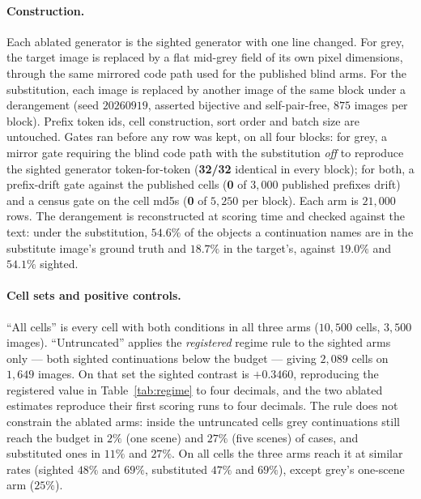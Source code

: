 \paragraph{Construction.} Each ablated generator is the sighted generator with one line changed. For
grey, the target image is replaced by a flat mid-grey field of its own pixel dimensions, through the
same mirrored code path used for the published blind arms. For the substitution, each image is
replaced by another image of the same block under a derangement (seed $20260919$, asserted bijective
and self-pair-free, $875$ images per block). Prefix token ids, cell construction, sort order and
batch size are untouched. Gates ran before any row was kept, on all four blocks: for grey, a mirror
gate requiring the blind code path with the substitution \emph{off} to reproduce the sighted
generator token-for-token (\textbf{32/32} identical in every block); for both, a prefix-drift gate
against the published cells (\textbf{0} of $3{,}000$ published prefixes drift) and a census gate on
the cell md5s (\textbf{0} of $5{,}250$ per block). Each arm is $21{,}000$ rows. The derangement is
reconstructed at scoring time and checked against the text: under the substitution, $54.6\%$ of the
objects a continuation names are in the substitute image's ground truth and $18.7\%$ in the
target's, against $19.0\%$ and $54.1\%$ sighted.

\paragraph{Cell sets and positive controls.} ``All cells'' is every cell with both conditions in all
three arms ($10{,}500$ cells, $3{,}500$ images). ``Untruncated'' applies the \emph{registered} regime rule
to the sighted arms only --- both sighted continuations below the budget --- giving $2{,}089$ cells on
$1{,}649$ images. On that set the sighted contrast is $+0.3460$, reproducing the registered value in
Table~\ref{tab:regime} to four decimals, and the two ablated estimates reproduce their first scoring
runs to four decimals. The rule does not constrain the ablated arms: inside the untruncated cells grey
continuations still reach the budget in $2\%$ (one scene) and $27\%$ (five scenes) of cases, and
substituted ones in $11\%$ and $27\%$. On all cells the three arms reach it at similar rates (sighted
$48\%$ and $69\%$, substituted $47\%$ and $69\%$), except grey's one-scene arm ($25\%$).

